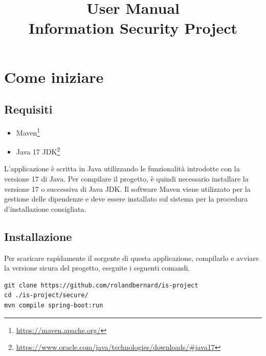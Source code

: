 \documentclass[conference,onecolumn,a4paper]{IEEEtran}
\begin{document}
\title{
    \Huge{User Manual} \\
    \large{Information Security Project}
}

\author{
}

\maketitle
\thispagestyle{plain}
\pagestyle{plain}

\section{Come iniziare}

\subsection{Requisiti}

\begin{itemize}
    \item Maven\footnote{\url{https://maven.apache.org/}}
    \item Java 17 JDK\footnote{\url{https://www.oracle.com/java/technologies/downloads/\#java17}}
\end{itemize}

L'applicazione è scritta in Java utilizzando le funzionalità introdotte con la versione 17 di Java. Per compilare il progetto, è quindi necessario installare la versione 17 o successiva di Java JDK. Il software Maven viene utilizzato per la gestione delle dipendenze e deve essere installato sul sistema per la procedura d'installazione consigliata.

\subsection{Installazione}

Per scaricare rapidamente il sorgente di questa applicazione, compilarlo e avviare la versione sicura del progetto, eseguite i seguenti comandi.


\begin{verbatim}
git clone https://github.com/rolandbernard/is-project
cd ./is-project/secure/
mvn compile spring-boot:run
\end{verbatim}
\end{document}
